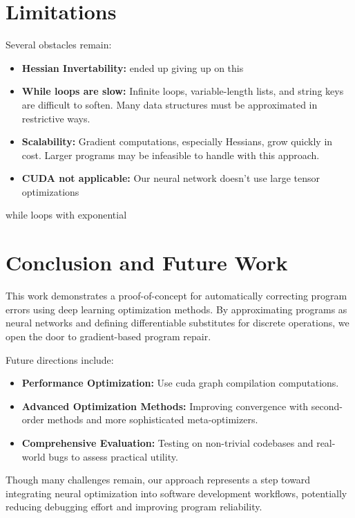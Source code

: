 \documentclass{article}
\begin{document}
\section{Limitations}
Several obstacles remain:
\begin{itemize}
    \item \textbf{Hessian Invertability:} ended up giving up on this
    \item \textbf{While loops are slow:} Infinite loops, variable-length lists, and string keys are difficult to soften. Many data structures must be approximated in restrictive ways.
    \item \textbf{Scalability:} Gradient computations, especially Hessians, grow quickly in cost. Larger programs may be infeasible to handle with this approach.
    \item \textbf{CUDA not applicable:} Our neural network doesn't use large tensor optimizations
\end{itemize}

while loops with exponential

\section{Conclusion and Future Work}
This work demonstrates a proof-of-concept for automatically correcting program errors using deep learning optimization methods. By approximating programs as neural networks and defining differentiable substitutes for discrete operations, we open the door to gradient-based program repair.

Future directions include:
\begin{itemize}
    \item \textbf{Performance Optimization:} Use cuda graph compilation computations.
    \item \textbf{Advanced Optimization Methods:} Improving convergence with second-order methods and more sophisticated meta-optimizers.
    \item \textbf{Comprehensive Evaluation:} Testing on non-trivial codebases and real-world bugs to assess practical utility.
\end{itemize}

Though many challenges remain, our approach represents a step toward integrating neural optimization into software development workflows, potentially reducing debugging effort and improving program reliability.



\end{document}
